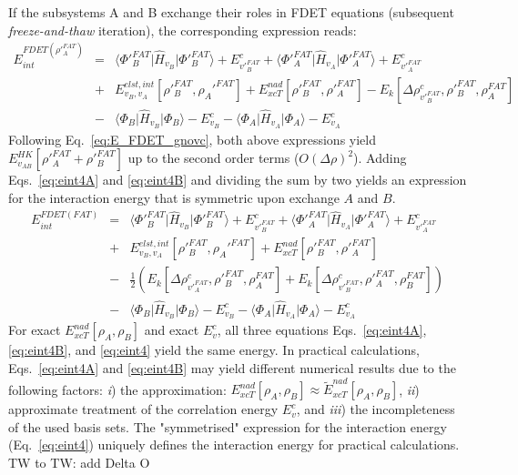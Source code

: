 \documentclass[journal=jctcce,manuscript=article]{achemso}
\newcommand{\nr}[1]{\color{red}#1\color{black}}
\begin{document}
If the subsystems A and B exchange their roles in FDET equations (subsequent \textit{freeze-and-thaw} iteration), the corresponding 
expression reads:
 \begin{eqnarray}
E_{int}^{FDET(\rho'^{FAT}_A)} 
&=&  \langle\Phi'^{FAT}_{B}\vert \hat{H}_{v_B}\vert \Phi'^{FAT}_{B}\rangle + E^{c}_{v'^{FAT}_B} + \langle\Phi'^{FAT}_{A}\vert \hat{H}_{v_A}\vert \Phi'^{FAT}_{A}\rangle  + E^{c}_{v'^{FAT}_A} \label{eq:eint4B}\\ \nonumber
&+& E^{elst,int}_{v_B,v_A}[\rho'^{FAT}_B,\rho_A'^{FAT}] + {E}_{xcT}^{nad}[\rho'^{FAT}_B,\rho'^{FAT}_A]-     E_k[\Delta \rho^{c}_{v'^{FAT}_B}, \rho'^{FAT}_B, \rho^{FAT}_A]  \nonumber\\
&-& 
\langle\Phi_{B}\vert \hat{H}_{v_B}\vert \Phi_{B}\rangle - E^{c}_{v_B}
- \langle\Phi_{A}\vert \hat{H}_{v_A}\vert \Phi_{A}\rangle - E^{c}_{v_A}\nonumber
\end{eqnarray}
Following Eq.~\ref{eq:E_FDET_gnovc}, both above expressions yield $E_{v_{AB}}^{HK}[\rho'^{FAT}_A+\rho'^{FAT}_B]$ up to the second order terms ($O(\Delta\rho)^2$). 
Adding Eqs.~\ref{eq:eint4A} and \ref{eq:eint4B}  and dividing the sum by two yields an expression for the interaction energy that is symmetric upon exchange $A$ and $B$.
\begin{eqnarray}
E_{int}^{FDET(FAT)} 
&=&  \langle\Phi'^{FAT}_{B}\vert \hat{H}_{v_B}\vert \Phi'^{FAT}_{B}\rangle + E^{c}_{v'^{FAT}_B} + \langle\Phi'^{FAT}_{A}\vert \hat{H}_{v_A}\vert \Phi'^{FAT}_{A}\rangle  + E^{c}_{v'^{FAT}_A} \label{eq:eint4}\\ \nonumber
&+& E^{elst,int}_{v_B,v_A}[\rho'^{FAT}_B,\rho_A'^{FAT}] + {E}_{xcT}^{nad}[\rho'^{FAT}_B,\rho'^{FAT}_A] \nonumber \\
&-&    \frac{1}{2}\left(E_k[\Delta \rho^{c}_{v'^{FAT}_A}, \rho'^{FAT}_B, \rho^{FAT}_A]  + E_k[\Delta \rho^{c}_{v'^{FAT}_B}, \rho'^{FAT}_A, \rho^{FAT}_B] \right) \nonumber\\
&-& 
\langle\Phi_{B}\vert \hat{H}_{v_B}\vert \Phi_{B}\rangle - E^{c}_{v_B}
- \langle\Phi_{A}\vert \hat{H}_{v_A}\vert \Phi_{A}\rangle - E^{c}_{v_A}\nonumber
\end{eqnarray}
For exact ${E}_{xcT}^{nad}[\rho_A,\rho_B]$ and exact $E^c_{v}$, all three equations
Eqs.~\ref{eq:eint4A}, \ref{eq:eint4B}, and \ref{eq:eint4} yield the same energy.
In practical calculations, 
Eqs.~\ref{eq:eint4A} and \ref{eq:eint4B} \nr{may } yield different numerical results due to the following factors:
{\it i})  the approximation: ${E}_{xcT}^{nad}[\rho_A,\rho_B]\approx \tilde{E}_{xcT}^{nad}[\rho_A,\rho_B]$, 
{\it ii}) approximate treatment of the correlation energy $E^c_{v}$, and {\it iii}) the incompleteness of the used basis sets.
The "symmetrised" expression for the interaction energy (Eq.~\ref{eq:eint4}) \nr{uniquely defines } the interaction energy for practical calculations.
{\color{red}TW to TW:  add Delta O}
\end{document}
